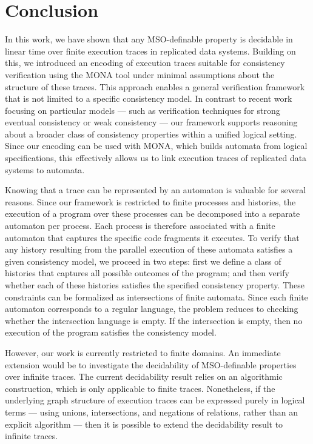 \documentclass[12pt]{article}
\begin{document}
\newpage

\section{Conclusion}


In this work, we have shown that any MSO-definable property is decidable in linear time over finite execution traces in replicated data systems. Building on this, we introduced an encoding of execution traces suitable for consistency verification using the MONA tool under minimal assumptions about the structure of these traces. This approach enables a general verification framework that is not limited to a specific consistency model. In contrast to recent work focusing on particular models --- such as verification techniques for strong eventual consistency \cite{PAPER1} or weak consistency \cite{PAPER3} --- our framework supports reasoning about a broader class of consistency properties within a unified logical setting. Since our encoding can be used with MONA, which builds automata from logical specifications, this effectively allows us to link execution traces of replicated data systems to automata. 

Knowing that a trace can be represented by an automaton is valuable for several reasons. Since our framework is restricted to finite processes and histories, the execution of a program over these processes can be decomposed into a separate automaton per process. Each process is therefore associated with a finite automaton that captures the specific code fragments it executes. To verify that any history resulting from the parallel execution of these automata satisfies a given consistency model, we proceed in two steps: first we define a class of histories that captures all possible outcomes of the program; and then verify whether each of these histories satisfies the specified consistency property. These constraints can be formalized as intersections of finite automata. Since each finite automaton corresponds to a regular language, the problem reduces to checking whether the intersection language is empty. If the intersection is empty, then no execution of the program satisfies the consistency model.

However, our work is currently restricted to finite domains. An immediate extension would be to investigate the decidability of MSO-definable properties over infinite traces. The current decidability result relies on an algorithmic construction, which is only applicable to finite traces. Nonetheless, if the underlying graph structure of execution traces can be expressed purely in logical terms --- using unions, intersections, and negations of relations, rather than an explicit algorithm --- then it is possible to extend the decidability result to infinite traces.
\end{document}
